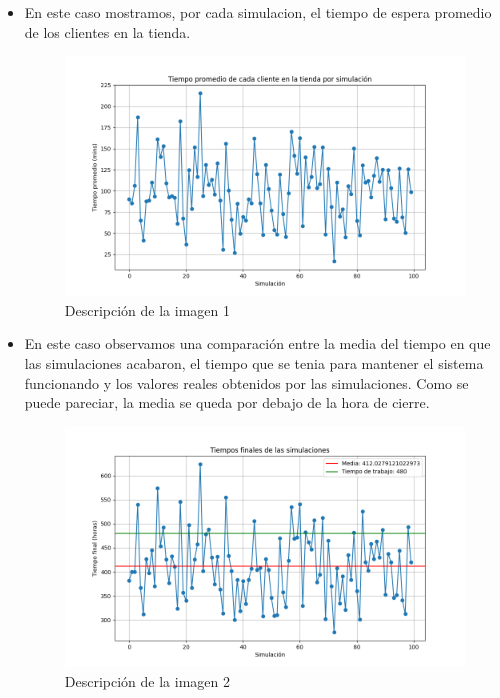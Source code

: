 \documentclass[
]{article}
\begin{document}
\begin{itemize}
\item
  En este caso mostramos, por cada simulacion, el tiempo de espera
  promedio de los clientes en la tienda.
\begin{figure}[!h] \centering \includegraphics{mi_grafica.png} \caption{Descripción de la imagen 1} \label{fig:mi_grafica} \end{figure}

\item
  En este caso observamos una comparación entre la media del tiempo en
  que las simulaciones acabaron, el tiempo que se tenia para mantener el
  sistema funcionando y los valores reales obtenidos por las
  simulaciones. Como se puede pareciar, la media se queda por debajo de
  la hora de cierre. 
\begin{figure}[!h] \centering \includegraphics{mi_grafica2.png} \caption{Descripción de la imagen 2} \label{fig:mi_grafica2} \end{figure}


\end{itemize}
\end{document}
